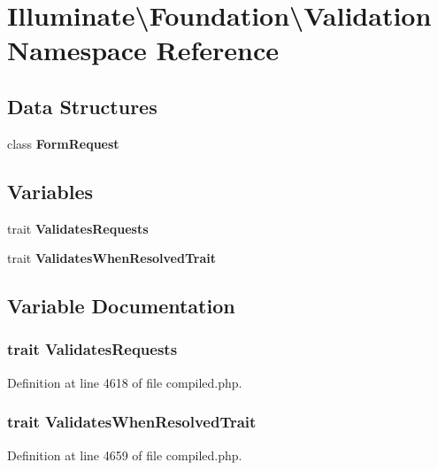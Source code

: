 \section{Illuminate\textbackslash{}Foundation\textbackslash{}Validation Namespace Reference}
\label{namespace_illuminate_1_1_foundation_1_1_validation}
\subsection*{Data Structures}
\begin{DoxyCompactItemize}
\item 
class {\bf Form\+Request}
\end{DoxyCompactItemize}
\subsection*{Variables}
\begin{DoxyCompactItemize}
\item 
trait {\bf Validates\+Requests}
\item 
trait {\bf Validates\+When\+Resolved\+Trait}
\end{DoxyCompactItemize}


\subsection{Variable Documentation}
\subsubsection[{Validates\+Requests}]{\setlength{\rightskip}{0pt plus 5cm}trait Validates\+Requests}\label{namespace_illuminate_1_1_foundation_1_1_validation_a2a88b6628082d618b6fe20cbfc21fa0f}


Definition at line 4618 of file compiled.\+php.

\subsubsection[{Validates\+When\+Resolved\+Trait}]{\setlength{\rightskip}{0pt plus 5cm}trait Validates\+When\+Resolved\+Trait}\label{namespace_illuminate_1_1_foundation_1_1_validation_a4c2f2568da9beaa0e12b84aad92fb030}


Definition at line 4659 of file compiled.\+php.

